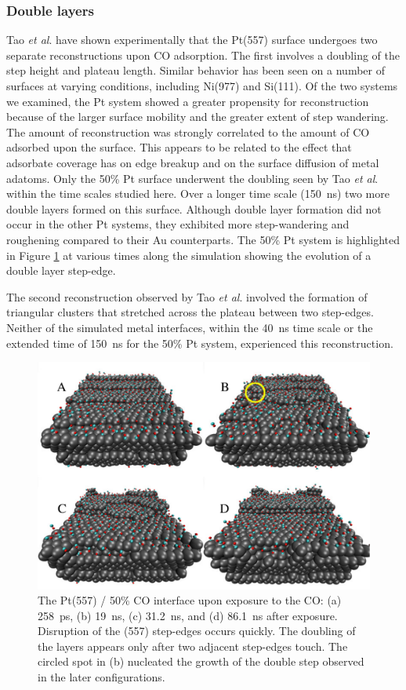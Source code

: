 \documentclass[journal = jpccck, manuscript = article]{achemso}
\begin{document}
\subsubsection{Double layers}
Tao {\it et al}.\cite{Tao:2010} have shown experimentally that the
Pt(557) surface undergoes two separate reconstructions upon CO
adsorption.  The first involves a doubling of the step height and
plateau length.  Similar behavior has been seen on a number of
surfaces at varying conditions, including Ni(977) and
Si(111).\cite{Williams:1994,Williams:1991,Pearl} Of the two systems we
examined, the Pt system showed a greater propensity for reconstruction
because of the larger surface mobility and the greater extent of step
wandering.  The amount of reconstruction was strongly correlated to
the amount of CO adsorbed upon the surface.  This appears to be
related to the effect that adsorbate coverage has on edge breakup and
on the surface diffusion of metal adatoms. Only the 50\% Pt surface
underwent the doubling seen by Tao {\it et al}.\cite{Tao:2010} within
the time scales studied here.  Over a longer time scale (150~ns) two
more double layers formed on this surface. Although double layer
formation did not occur in the other Pt systems, they exhibited more
step-wandering and roughening compared to their Au counterparts. The
50\% Pt system is highlighted in Figure \ref{fig:reconstruct} at
various times along the simulation showing the evolution of a double
layer step-edge.

The second reconstruction observed by Tao {\it et al}.\cite{Tao:2010}
involved the formation of triangular clusters that stretched across
the plateau between two step-edges. Neither of the simulated metal
interfaces, within the 40~ns time scale or the extended time of 150~ns
for the 50\% Pt system, experienced this reconstruction.

\begin{figure}[H]
\includegraphics[width=\linewidth]{EPS_ProgressionOfDoubleLayerFormation}
\caption{The Pt(557) / 50\% CO interface upon exposure to the CO: (a)
  258~ps, (b) 19~ns, (c) 31.2~ns, and (d) 86.1~ns after
  exposure. Disruption of the (557) step-edges occurs quickly.  The
  doubling of the layers appears only after two adjacent step-edges
  touch.  The circled spot in (b) nucleated the growth of the double
  step observed in the later configurations.}
  \label{fig:reconstruct}
\end{figure}
\end{document}
